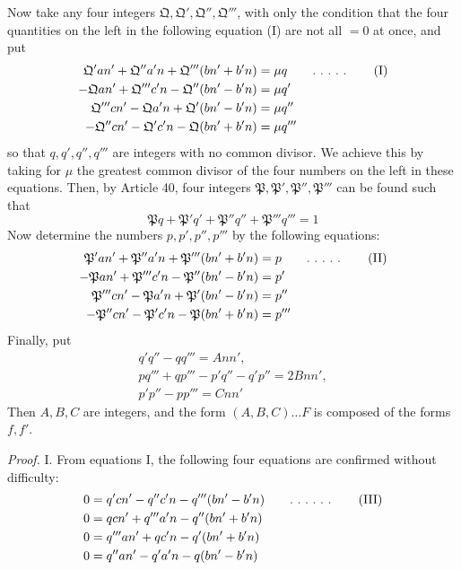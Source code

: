 Now take any four integers $\mathfrak{Q},\mathfrak{Q}',\mathfrak{Q}'',\mathfrak{Q}'''$, with only the condition that the four quantities on the left in the following equation (I) are not all $=0$ at once, and put
\[
\begin{aligned}
\mathfrak{Q}'an'+\mathfrak{Q}''a'n+\mathfrak{Q}'''(bn'+b'n)&=\mu q\qquad\ldotp\,\ldotp\,\ldotp\,\ldotp\,\ldotp\qquad\text{(I)}\\
-\mathfrak{Q}an'+\mathfrak{Q}'''c'n-\mathfrak{Q}''(bn'-b'n)&=\mu q'\\
\mathfrak{Q}'''cn'-\mathfrak{Q}a'n+\mathfrak{Q}'(bn'-b'n)&=\mu q''\\
-\mathfrak{Q}''cn'-\mathfrak{Q}'c'n-\mathfrak{Q}(bn'+b'n)&=\mu q'''
\end{aligned}
\]
so that $q,q',q'',q'''$ are integers with no common divisor. We achieve this by taking for $\mu$ the greatest common divisor of the four numbers on the left in these equations. Then, by Article 40, four integers $\mathfrak{P},\mathfrak{P}',\mathfrak{P}'',\mathfrak{P}'''$ can be found such that
\[
\mathfrak{P}q+\mathfrak{P}'q'+\mathfrak{P}''q''+\mathfrak{P}'''q'''=1
\]
Now determine the numbers $p,p',p'',p'''$ by the following equations:
\[
\begin{aligned}
\mathfrak{P}'an'+\mathfrak{P}''a'n+\mathfrak{P}'''(bn'+b'n)&=p\qquad\ldotp\,\ldotp\,\ldotp\,\ldotp\,\ldotp\qquad\text{(II)}\\
-\mathfrak{P}an'+\mathfrak{P}'''c'n-\mathfrak{P}''(bn'-b'n)&=p'\\
\mathfrak{P}'''cn'-\mathfrak{P}a'n+\mathfrak{P}'(bn'-b'n)&=p''\\
-\mathfrak{P}''cn'-\mathfrak{P}'c'n-\mathfrak{P}(bn'+b'n)&=p'''
\end{aligned}
\]
Finally, put
\[
\begin{gathered}q'q''-qq'''=Ann',\\pq'''+qp'''-p'q''-q'p''=2Bnn',\\p'p''-pp'''=Cnn'\end{gathered}
\]
Then $A,B,C$ are integers, and the form $(A,B,C)\ldots F$ is composed of the forms $f,f'$.

\textit{Proof.} I. From equations I, the following four equations are confirmed without difficulty:
\[
\begin{aligned}
0&=q'cn'-q''c'n-q'''(bn'-b'n)\qquad\ldotp\,\ldotp\,\ldotp\,\ldotp\,\ldotp\,\ldotp\qquad\text{(III)}\\
0&=qcn'+q'''a'n-q''(bn'+b'n)\\
0&=q'''an'+qc'n-q'(bn'+b'n)\\
0&=q''an'-q'a'n-q(bn'-b'n)
\end{aligned}
\]

